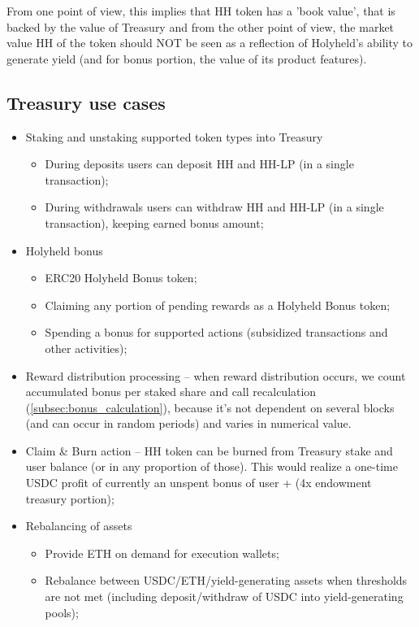 \documentclass[12pt]{article}
\begin{document}
From one point of view, this implies that HH token has a 'book value', that is backed by the value of Treasury and from the other point of view, the market value HH of the token should NOT be seen as a reflection of Holyheld's ability to generate yield (and for bonus portion, the value of its product features).

\bigskip


\subsection{Treasury use cases}

\begin{itemize}
	\item Staking and unstaking supported token types into Treasury
		\begin{itemize}
			\item During deposits users can deposit HH and HH-LP (in a single transaction);
      \item During withdrawals users can withdraw HH and HH-LP (in a single transaction), keeping earned bonus amount;
		\end{itemize}
	\item Holyheld bonus
    \begin{itemize}
      \item ERC20 Holyheld Bonus token;
			\item Claiming any portion of pending rewards as a Holyheld Bonus token;
      \item Spending a bonus for supported actions (subsidized transactions and other activities);
		\end{itemize}
	\item Reward distribution processing -- when reward distribution occurs, we count accumulated bonus per staked share and call recalculation (\ref{subsec:bonus_calculation}), because it's not dependent on several blocks (and can occur in random periods) and varies in numerical value.
	\item Claim \& Burn action -- HH token can be burned from Treasury stake and user balance (or in any proportion of those). This would realize a one-time USDC profit of currently an unspent bonus of user + (4x endowment treasury portion);
  \item Rebalancing of assets
    \begin{itemize}
			\item Provide ETH on demand for execution wallets;
			\item Rebalance between USDC/ETH/yield-generating assets when thresholds are not met (including deposit/withdraw of USDC into yield-generating pools);
    \end{itemize}
\end{itemize}
\end{document}
